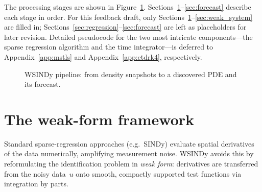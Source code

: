 \documentclass{report}
\theoremstyle{plain}
\theoremstyle{remark}
\numberwithin{equation}{section}              %
\def\feedbackdraft{1}
\begin{document}
The processing stages are shown in Figure~\ref{fig:wsindy_pipeline_flow}.
Sections~\ref{sec:weak_form}--\ref{sec:forecast} describe each stage
in order.
\ifdefined\feedbackdraft
For this feedback draft, only Sections~\ref{sec:weak_form}--\ref{sec:weak_system}
are filled in; Sections~\ref{sec:regression}--\ref{sec:forecast} are left as
placeholders for later revision.
\else
Detailed pseudocode for the two most intricate components—the sparse
regression algorithm and the time integrator—is deferred to
Appendix~\ref{app:mstls} and Appendix~\ref{app:etdrk4}, respectively.
\fi

\begin{figure}[ht]
\centering
{}
\caption{WSINDy pipeline: from density snapshots to a discovered PDE and its forecast.}
\label{fig:wsindy_pipeline_flow}
\end{figure}

%
\section{The weak-form framework}
\label{sec:weak_form}

Standard sparse-regression approaches (e.g.\ SINDy) evaluate spatial
derivatives of the data numerically, amplifying measurement noise.
WSINDy avoids this by reformulating the identification problem in
\emph{weak form}: derivatives are transferred from the noisy data~$u$ onto
smooth, compactly supported test functions via integration by parts.
\end{document}
